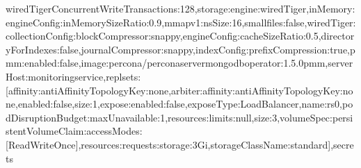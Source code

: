 \documentclass[letterpaper,10pt,english]{sphinxmanual}
\begin{document}
\begin{sphinxVerbatim}[commandchars=\\\{\}]
wiredTigerConcurrentWriteTransactions\PYGZbs{}\PYGZdq{}:128\PYGZcb{},\PYGZbs{}\PYGZdq{}storage\PYGZbs{}\PYGZdq{}:\PYGZob{}\PYGZbs{}\PYGZdq{}engine\PYGZbs{}\PYGZdq{}:\PYGZbs{}\PYGZdq{}wiredTiger\PYGZbs{}\PYGZdq{},\PYGZbs{}\PYGZdq{}inMemory\PYGZbs{}\PYGZdq{}:\PYGZob{}\PYGZbs{}\PYGZdq{}engineConfig\PYGZbs{}\PYGZdq{}:\PYGZob{}\PYGZbs{}\PYGZdq{}inMemorySizeRatio\PYGZbs{}\PYGZdq{}:0.9\PYGZcb{}\PYGZcb{},\PYGZbs{}\PYGZdq{}mmapv1\PYGZbs{}\PYGZdq{}:\PYGZob{}\PYGZbs{}\PYGZdq{}nsSize\PYGZbs{}\PYGZdq{}:16,\PYGZbs{}\PYGZdq{}smallfiles\PYGZbs{}\PYGZdq{}:false\PYGZcb{},\PYGZbs{}\PYGZdq{}wiredTiger\PYGZbs{}\PYGZdq{}:\PYGZob{}\PYGZbs{}\PYGZdq{}collectionConfig\PYGZbs{}\PYGZdq{}:\PYGZob{}\PYGZbs{}\PYGZdq{}blockCompressor\PYGZbs{}\PYGZdq{}:\PYGZbs{}\PYGZdq{}snappy\PYGZbs{}\PYGZdq{}\PYGZcb{},\PYGZbs{}\PYGZdq{}engineConfig\PYGZbs{}\PYGZdq{}:\PYGZob{}\PYGZbs{}\PYGZdq{}cacheSizeRatio\PYGZbs{}\PYGZdq{}:0.5,\PYGZbs{}\PYGZdq{}directoryForIndexes\PYGZbs{}\PYGZdq{}:false,\PYGZbs{}\PYGZdq{}journalCompressor\PYGZbs{}\PYGZdq{}:\PYGZbs{}\PYGZdq{}snappy\PYGZbs{}\PYGZdq{}\PYGZcb{},\PYGZbs{}\PYGZdq{}indexConfig\PYGZbs{}\PYGZdq{}:\PYGZob{}\PYGZbs{}\PYGZdq{}prefixCompression\PYGZbs{}\PYGZdq{}:true\PYGZcb{}\PYGZcb{}\PYGZcb{}\PYGZcb{},\PYGZbs{}\PYGZdq{}pmm\PYGZbs{}\PYGZdq{}:\PYGZob{}\PYGZbs{}\PYGZdq{}enabled\PYGZbs{}\PYGZdq{}:false,\PYGZbs{}\PYGZdq{}image\PYGZbs{}\PYGZdq{}:\PYGZbs{}\PYGZdq{}percona/percona\PYGZhy{}server\PYGZhy{}mongodb\PYGZhy{}operator:1.5.0\PYGZhy{}pmm\PYGZbs{}\PYGZdq{},\PYGZbs{}\PYGZdq{}serverHost\PYGZbs{}\PYGZdq{}:\PYGZbs{}\PYGZdq{}monitoring\PYGZhy{}service\PYGZbs{}\PYGZdq{}\PYGZcb{},\PYGZbs{}\PYGZdq{}replsets\PYGZbs{}\PYGZdq{}:[\PYGZob{}\PYGZbs{}\PYGZdq{}affinity\PYGZbs{}\PYGZdq{}:\PYGZob{}\PYGZbs{}\PYGZdq{}antiAffinityTopologyKey\PYGZbs{}\PYGZdq{}:\PYGZbs{}\PYGZdq{}none\PYGZbs{}\PYGZdq{}\PYGZcb{},\PYGZbs{}\PYGZdq{}arbiter\PYGZbs{}\PYGZdq{}:\PYGZob{}\PYGZbs{}\PYGZdq{}affinity\PYGZbs{}\PYGZdq{}:\PYGZob{}\PYGZbs{}\PYGZdq{}antiAffinityTopologyKey\PYGZbs{}\PYGZdq{}:\PYGZbs{}\PYGZdq{}none\PYGZbs{}\PYGZdq{}\PYGZcb{},\PYGZbs{}\PYGZdq{}enabled\PYGZbs{}\PYGZdq{}:false,\PYGZbs{}\PYGZdq{}size\PYGZbs{}\PYGZdq{}:1\PYGZcb{},\PYGZbs{}\PYGZdq{}expose\PYGZbs{}\PYGZdq{}:\PYGZob{}\PYGZbs{}\PYGZdq{}enabled\PYGZbs{}\PYGZdq{}:false,\PYGZbs{}\PYGZdq{}exposeType\PYGZbs{}\PYGZdq{}:\PYGZbs{}\PYGZdq{}LoadBalancer\PYGZbs{}\PYGZdq{}\PYGZcb{},\PYGZbs{}\PYGZdq{}name\PYGZbs{}\PYGZdq{}:\PYGZbs{}\PYGZdq{}rs0\PYGZbs{}\PYGZdq{},\PYGZbs{}\PYGZdq{}podDisruptionBudget\PYGZbs{}\PYGZdq{}:\PYGZob{}\PYGZbs{}\PYGZdq{}maxUnavailable\PYGZbs{}\PYGZdq{}:1\PYGZcb{},\PYGZbs{}\PYGZdq{}resources\PYGZbs{}\PYGZdq{}:\PYGZob{}\PYGZbs{}\PYGZdq{}limits\PYGZbs{}\PYGZdq{}:null\PYGZcb{},\PYGZbs{}\PYGZdq{}size\PYGZbs{}\PYGZdq{}:3,\PYGZbs{}\PYGZdq{}volumeSpec\PYGZbs{}\PYGZdq{}:\PYGZob{}\PYGZbs{}\PYGZdq{}persistentVolumeClaim\PYGZbs{}\PYGZdq{}:\PYGZob{}\PYGZbs{}\PYGZdq{}accessModes\PYGZbs{}\PYGZdq{}:[\PYGZbs{}\PYGZdq{}ReadWriteOnce\PYGZbs{}\PYGZdq{}],\PYGZbs{}\PYGZdq{}resources\PYGZbs{}\PYGZdq{}:\PYGZob{}\PYGZbs{}\PYGZdq{}requests\PYGZbs{}\PYGZdq{}:\PYGZob{}\PYGZbs{}\PYGZdq{}storage\PYGZbs{}\PYGZdq{}:\PYGZbs{}\PYGZdq{}3Gi\PYGZbs{}\PYGZdq{}\PYGZcb{}\PYGZcb{},\PYGZbs{}\PYGZdq{}storageClassName\PYGZbs{}\PYGZdq{}:\PYGZbs{}\PYGZdq{}standard\PYGZbs{}\PYGZdq{}\PYGZcb{}\PYGZcb{}\PYGZcb{}],\PYGZbs{}\PYGZdq{}secrets\PYGZb
\end{sphinxVerbatim}
\end{document}
